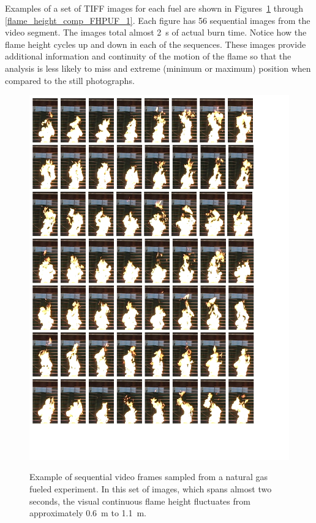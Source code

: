 \documentclass[twoside]{uocthesis}
\begin{document}
{{Examples of a set of TIFF images for each fuel are shown in Figures~\ref{flame_height_comp_FHNG80_1} through \ref{flame_height_comp_FHPUF_1}.   Each figure has 56 sequential images from the video segment.  The images total almost 2~s of actual burn time.  Notice how the flame height cycles up and down in each of the sequences.  These images provide additional information and continuity of the motion of the flame so that the analysis is less likely to miss and extreme (minimum or maximum) position when compared to the still photographs.
\begin{figure}
	\centering
	\includegraphics[width=\textwidth]{../Figures/flame_height_comp_FHNG80}\\
	\caption[Example of sequential video frames sampled from a natural gas fueled experiment]{Example of sequential video frames sampled from a natural gas fueled experiment.  In this set of images, which spans almost two seconds, the visual continuous flame height fluctuates from approximately 0.6~m to 1.1~m.}
	\label{flame_height_comp_FHNG80_1}
\end{figure}

}}
\end{document}
